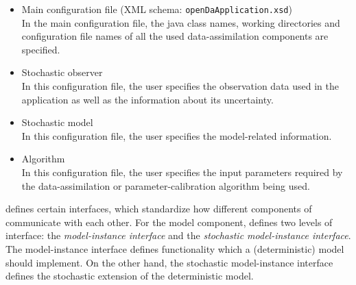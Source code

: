 \begin{itemize}
    \item Main configuration file (XML schema: \verb|openDaApplication.xsd|) \\
          In the main configuration file, the \oda java class names, working directories and configuration file names of all the used data-assimilation components are specified.
    \item Stochastic observer \\
		In this configuration file, the user specifies the observation data used in the application as well as the information about its uncertainty.
    \item Stochastic model \\
		In this configuration file, the user specifies the model-related information.
    \item Algorithm \\
		In this configuration file, the user specifies the input parameters required by the data-assimilation or parameter-calibration algorithm being used.
\end{itemize}

\oda defines certain interfaces, which standardize how different components of \oda communicate with each other. For the model component, \oda defines two levels of interface: the \emph{model-instance interface} and the \emph{stochastic model-instance interface}. The model-instance interface defines functionality which a (deterministic) model should implement. On the other hand, the stochastic model-instance interface defines the stochastic extension of the deterministic model.

